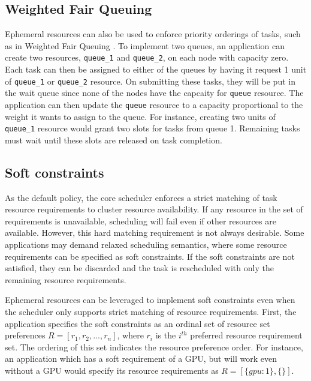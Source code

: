 \subsection{Weighted Fair Queuing}

Ephemeral resources can also be used to enforce priority orderings of tasks, such as in Weighted Fair Queuing \cite{wfq}. To implement two queues, an application can create two resources, \lstinline{queue_1} and \lstinline{queue_2}, on each node with capacity zero. Each task can then be assigned to either of the queues by having it request 1 unit of \lstinline{queue_1} or \lstinline{queue_2} resource. On submitting these tasks, they will be put in the wait queue since none of the nodes have the capcaity for \lstinline{queue} resource. The application can then update the \lstinline{queue} resource to a capacity proportional to the weight it wants to assign to the queue. For instance, creating two units of \lstinline{queue_1} resource would grant two slots for tasks from queue 1. Remaining tasks must wait until these slots are released on task completion.


\subsection{Soft constraints}
\label{softconstr}
As the default policy, the core scheduler enforces a strict matching of task resource requirements to cluster resource availability. If any resource in the set of requirements is unavailable, scheduling will fail even if other resources are available. However, this hard matching requirement is not always desirable. Some applications may demand relaxed scheduling semantics, where some resource requirements can be specified as soft constraints. If the soft constraints are not satisfied, they can be discarded and the task is rescheduled with only the remaining resource requirements.

Ephemeral resources can be leveraged to implement soft constraints even when the scheduler only supports strict matching of resource requirements. First, the application specifies the soft constraints as an ordinal set of resource set preferences $R = [r_1, r_2, ..., r_n]$, where $r_i$ is the $i^{th}$ preferred resource requirement set. The ordering of this set indicates the resource preference order. For instance, an application which has a soft requirement of a GPU, but will work even without a GPU would specify its resource requirements as $R = [\{gpu: 1\}, \{\} ]$.

